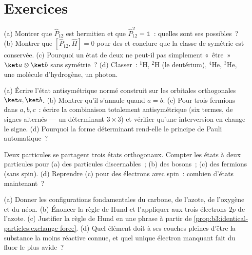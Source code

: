 \section{Exercices}

\begin{exercise}[$\star$]\label{exo:b3:identical-particles:1}
(a) Montrer que $\hat P_{12}$ est hermitien et que $\hat P_{12}^2 = \mathbb 1$~:
quelles sont ses  possibles~? (b) Montrer que $[\hat P_{12}, \hat H] =
0$ pour des  et conclure que la classe de
symétrie est conservée. (c) Pourquoi un état de deux  ne peut-il pas simplement «~être~» $\ket a\otimes\ket b$
sans symétrie~? (d) Classer~: $^1$H, $^2$H (le deutérium), $^4$He,
$^3$He, une molécule d'hydrogène, un photon.
\end{exercise}

\begin{exercise}[$\star$]\label{exo:b3:identical-particles:2}
(a) Écrire l'état antisymétrique normé construit sur les orbitales
orthogonales $\ket a, \ket b$. (b) Montrer qu'il s'annule quand
$a = b$. (c) Pour trois fermions dans $a, b, c$~: écrire la
combinaison totalement antisymétrique (six termes, de signes alternés
--- un déterminant $3\times3$) et vérifier qu'une interversion en
change le signe. (d) Pourquoi la forme déterminant rend-elle le
principe de Pauli automatique~?
\end{exercise}

\begin{exercise}[$\star$]\label{exo:b3:identical-particles:3}
Deux particules se partagent trois états orthogonaux. Compter les
états à deux particules pour (a) des particules discernables~; (b) des
bosons~; (c) des fermions (sans spin). (d) Reprendre (c) pour des
électrons avec spin~: combien d'états maintenant~?
\end{exercise}

\begin{exercise}[$\star$]\label{exo:b3:identical-particles:4}
(a) Donner les configurations fondamentales du carbone, de l'azote, de
l'oxygène et du néon. (b) Énoncer la règle de Hund et l'appliquer aux
trois électrons $2p$ de l'azote. (c) Justifier la règle de Hund en une
phrase à partir de
\cref{prop:b3:identical-particles:exchange-force}. (d) Quel élément
doit à ses couches pleines d'être la substance la moins réactive
connue, et quel unique électron manquant fait du fluor le plus avide~?
\end{exercise}

